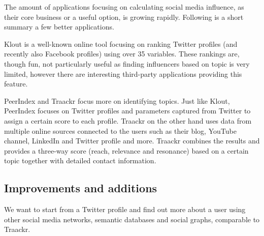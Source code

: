 The amount of applications focusing on calculating social media influence, as their core business or a useful option, is growing rapidly. Following is a short summary a few better applications.

Klout is a well-known online tool focusing on ranking Twitter profiles (and recently also Facebook profiles) using over 35 variables. These rankings are, though fun, not particularly useful as finding influencers based on topic is very limited, however there are interesting third-party applications providing this feature.

PeerIndex and Traackr focus more on identifying topics. Just like Klout, PeerIndex focuses on Twitter profiles and parameters captured from Twitter to assign a certain score to each profile. Traackr on the other hand uses data from multiple online sources connected to the users such as their blog, YouTube channel, LinkedIn and Twitter profile and more. Traackr combines the results and provides a three-way score (reach, relevance and resonance) based on a certain topic together with detailed contact information.

\subsection{Improvements and additions}


We want to start from a Twitter profile and find out more about a user using other social media networks, semantic databases and social graphs, comparable to Traackr. 

%
%
%
%


